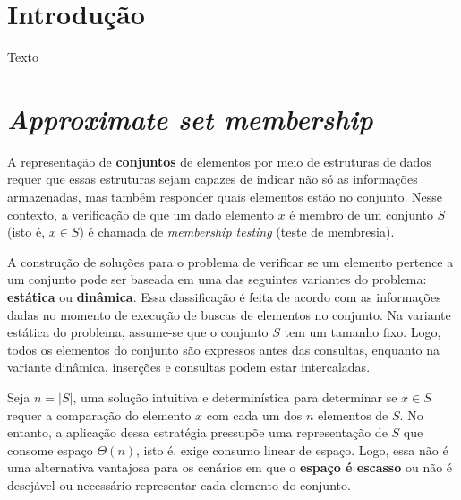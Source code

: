 \documentclass[12pt,twoside,english,brazilian]{book}
\begin{document}

\disablenewpage{\listoffigures}

\tableofcontents

\egroup %


\mainmatter

\pagestyle{mainmatter}

\singlespacing

\chapter{Introdução}

Texto

\newpage

\chapter{\textit{Approximate set membership}}

A representação de \textbf{conjuntos} de elementos por meio de estruturas de dados requer que essas estruturas sejam capazes de indicar não só as informações armazenadas, mas também responder quais elementos estão no conjunto. Nesse contexto, a verificação de que um dado elemento $x$ é membro de um conjunto $S$ (isto é, $x \in S$) é chamada de \textit{membership testing} (teste de membresia).

A construção de soluções para o problema de verificar se um elemento pertence a um conjunto pode ser baseada em uma das seguintes variantes do problema: \textbf{estática} ou \textbf{dinâmica}. Essa classificação é feita de acordo com as informações dadas no momento de execução de buscas de elementos no conjunto. Na variante estática do problema, assume-se que o conjunto $S$ tem um tamanho fixo. Logo, todos os elementos do conjunto são expressos antes das consultas, enquanto na variante dinâmica, inserções e consultas podem estar intercaladas.

Seja $n = |S|$, uma solução intuitiva e determinística para determinar se $x \in S$ requer a comparação do elemento $x$ com cada um dos $n$ elementos de $S$. No entanto, a aplicação dessa estratégia pressupõe uma representação de $S$ que consome espaço $\Theta(n)$, isto é, exige consumo linear de espaço. Logo, essa não é uma alternativa vantajosa para os cenários em que o \textbf{espaço é escasso} ou não é desejável ou necessário representar cada elemento do conjunto.
\end{document}
